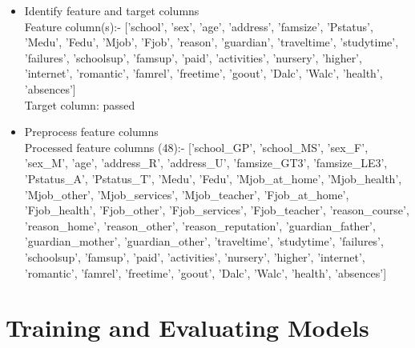\documentclass{article}
\begin{document}
\begin{itemize}
\item Identify feature and target columns \\
\color{blue}
Feature column(s):-
['school', 'sex', 'age', 'address', 'famsize', 'Pstatus', 'Medu', 'Fedu', 'Mjob', 'Fjob', 'reason', 'guardian', 'traveltime', 'studytime', 'failures', 'schoolsup', 'famsup', 'paid', 'activities', 'nursery', 'higher', 'internet', 'romantic', 'famrel', 'freetime', 'goout', 'Dalc', 'Walc', 'health', 'absences'] \\
Target column: passed
\color{black}
\item Preprocess feature columns \\
\color{blue}
Processed feature columns (48):-
['school\_GP', 'school\_MS', 'sex\_F', 'sex\_M', 'age', 'address\_R', 'address\_U', 'famsize\_GT3', 'famsize\_LE3', 'Pstatus\_A', 'Pstatus\_T', 'Medu', 'Fedu', 'Mjob\_at\_home', 'Mjob\_health', 'Mjob\_other', 'Mjob\_services', 'Mjob\_teacher', 'Fjob\_at\_home', 'Fjob\_health', 'Fjob\_other', 'Fjob\_services', 'Fjob\_teacher', 'reason\_course', 'reason\_home', 'reason\_other', 'reason\_reputation', 'guardian\_father', 'guardian\_mother', 'guardian\_other', 'traveltime', 'studytime', 'failures', 'schoolsup', 'famsup', 'paid', 'activities', 'nursery', 'higher', 'internet', 'romantic', 'famrel', 'freetime', 'goout', 'Dalc', 'Walc', 'health', 'absences']
\end{itemize}
\color{black}

\section{Training and Evaluating Models}
\end{document}
